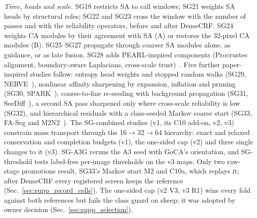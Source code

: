 \emph{Time, heads and scale.} SG18 restricts SA to call windows; SG21 weights SA heads by structural roles; SG22 and SG23 cross the window with the number of passes and with the reliability operators, before and after DenseCRF. SG24 weights CA modules by their agreement with SA (A) or restores the 32-pixel CA modules (B). SG25--SG27 propagate through coarser SA modules alone, as guidance, or as late fusion. SG28 adds PEARL-inspired components (Procrustes alignment, boundary-aware Laplacians, cross-scale trust)~\cite{pei2026pearl}. Five further paper-inspired studies follow: entropy head weights and stopped random walks (SG29, NERVE~\cite{mahatha2025nerve}), nonlinear affinity sharpening by expansion, inflation and pruning (SG30, SPARK~\cite{mahatha2026spark}), coarse-to-fine re-seeding with background propagation (SG31, SeeDiff~\cite{park2025seediff}), a second SA pass sharpened only where cross-scale reliability is low (SG32), and hierarchical residuals with a class-seeded Markov coarse start (SG33, FA-Seg and M2N2~\cite{che2025faseg,karmann2025m2n2}). The SG-combined studies (v1, its C10 add-on, v2, v3) constrain mass transport through the 16$\rightarrow$32$\rightarrow$64 hierarchy: exact and relaxed conservation and completion budgets (v1), the one-sided cap (v2) and three single changes to it (v3). SG-A3G reruns the A3 seed with GoCA's orientation, and SG-threshold tests label-free per-image thresholds on the v3 maps. Only two raw-stage promotions result, SG33's Markov start M2 and C10a, which replays it; after DenseCRF every registered screen keeps the reference (Sec.~\ref{sec:supp_record_cells}). The one-sided cap (v2 V3, v3 R1) wins every fold against both references but fails the class guard on sheep; it was adopted by owner decision (Sec.~\ref{sec:supp_selection}).
